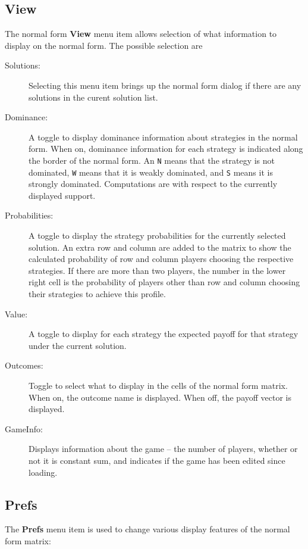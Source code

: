 \subsection{View}\label{nfinspectsec}
The normal form {\bf View} menu item allows selection of what
information to display on the normal form.  The possible selection are 

\begin{description}
\item[Solutions:]  Selecting this menu item brings up the normal form 
 dialog if
there are any solutions in the curent solution list.
\item[Dominance:]  A toggle to display dominance information about
strategies in the normal form. When on, dominance information for each
strategy is indicated along the border of the normal form.  An {\tt N} 
means that the strategy is not dominated, {\tt W} means that it is
weakly dominated, and {\tt S} means it is strongly
dominated.  Computations are with respect to the currently displayed
support.
\item[Probabilities:]  A toggle to display the strategy probabilities
for the currently selected solution.  An extra row and column are
added to the matrix to show the calculated probability of row and
column players choosing the respective strategies.  If there are more
than two players, the number in the lower right cell is the
probability of players other than row and column choosing their
strategies to achieve this profile.
\item[Value:]  A toggle to display for each strategy the expected 
payoff for that strategy under the current solution.  
\item[Outcomes:] Toggle to select what to display in the cells of the normal form matrix.  When on, the outcome name is displayed.  When off, the payoff vector is displayed.  
\item[GameInfo:] Displays information about the game -- the number
of players, whether or not it is constant sum, and indicates if the
game has been edited since loading.
\end{description}

\subsection{Prefs}
The {\bf Prefs} menu item is used to change various display features
of the normal form matrix:  

